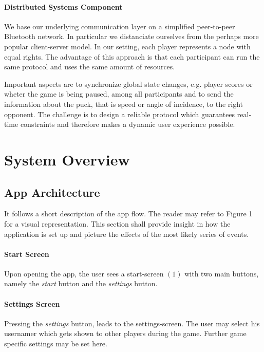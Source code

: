 \documentclass{report}
\begin{document}
\paragraph{Distributed Systems Component} We base our underlying communication layer on a simplified peer-to-peer Bluetooth network. In particular we distanciate ourselves from the perhaps more popular client-server model. In our setting, each player represents a node with equal rights. The advantage of this approach is that each participant can run the same protocol and uses the same amount of resources. 

Important aspects are to synchronize global state changes, e.g. player scores or wheter the game is being paused, among all participants and to send the information about the puck, that is speed or angle of incidence, to the right opponent. The challenge is to design a reliable protocol which guarantees real-time constraints and therefore makes a dynamic user experience possible.

\section{System Overview}

\subsection{App Architecture} 
It follows a short description of the app flow. The reader may refer to Figure 1 for a visual representation. This section shall provide insight in how the application is set up and picture the effects of the most likely series of events.

\paragraph{Start Screen}
 Upon opening the app, the user sees a start-screen $(1)$ with two main buttons, namely the \textit{start} button and the \textit{settings} button. 

\paragraph{Settings Screen}
Pressing the \textit{settings} button, leads to the settings-screen. The user may select his usernamer which gets shown to other players during the game. Further game specific settings may be set here.
\end{document}
